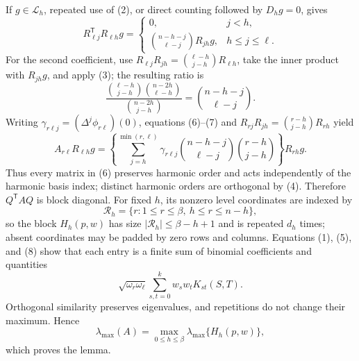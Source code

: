 If \(g\in\mathcal L_h\), repeated use of (2), or direct counting followed by \(D_hg=0\), gives
\[
R_{\ell j}^{\mathsf T}R_{\ell h}g
=\begin{cases}
0,&j<h,\\
\displaystyle\binom{n-h-j}{\ell-j}R_{jh}g,&h\le j\le\ell.
\end{cases}
\tag{7}
\]
For the second coefficient, use \(R_{\ell j}R_{jh}=\binom{\ell-h}{j-h}R_{\ell h}\), take the inner product with \(R_{jh}g\), and apply (3); the resulting ratio is
\[
\frac{\binom{\ell-h}{j-h}\binom{n-2h}{\ell-h}}
{\binom{n-2h}{j-h}}
=\binom{n-h-j}{\ell-j}.
\]
Writing \(\gamma_{r\ell j}=(\Delta^j\phi_{r\ell})(0)\), equations (6)--(7) and \(R_{rj}R_{jh}=\binom{r-h}{j-h}R_{rh}\) yield
\[
A_{r\ell}R_{\ell h}g
=\left\{
\sum_{j=h}^{\min(r,\ell)}
\gamma_{r\ell j}
\binom{n-h-j}{\ell-j}
\binom{r-h}{j-h}
\right\}R_{rh}g.
\tag{8}
\]
Thus every matrix in (6) preserves harmonic order and acts independently of the harmonic basis index; distinct harmonic orders are orthogonal by (4).  Therefore \(Q^{\mathsf T}AQ\) is block diagonal.  For fixed \(h\), its nonzero level coordinates are indexed by
\[
\mathcal R_h=\{r:1\le r\le\beta,\ h\le r\le n-h\},
\]
so the block \(H_h(p,w)\) has size \(|\mathcal R_h|\le\beta-h+1\) and is repeated \(d_h\) times; absent coordinates may be padded by zero rows and columns.  Equations (1), (5), and (8) show that each entry is a finite sum of binomial coefficients and quantities
\[
\sqrt{\omega_r\omega_\ell}\sum_{s,t=0}^kw_sw_tK_{st}(S,T).
\]
Orthogonal similarity preserves eigenvalues, and repetitions do not change their maximum.  Hence
\[
\lambda_{\max}(A)
=\max_{0\le h\le\beta}\lambda_{\max}\{H_h(p,w)\},
\]
which proves the lemma.